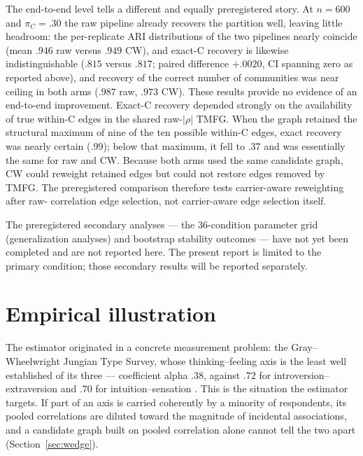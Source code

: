 \documentclass[11pt]{article}
\begin{document}
The end-to-end level tells a different and equally preregistered story.
At $n=600$ and $\pi_C=.30$ the raw pipeline already recovers the
partition well, leaving little headroom: the per-replicate ARI
distributions of the two pipelines nearly coincide (mean $.946$ raw
versus $.949$ CW), and exact-C recovery is likewise indistinguishable
($.815$ versus $.817$; paired difference $+.0020$, CI spanning zero as
reported above), and recovery of the correct number of communities was
near ceiling in both arms ($.987$ raw, $.973$ CW). These results provide no evidence of an end-to-end
improvement. Exact-C recovery depended strongly on the availability of true
within-C edges in the shared raw-$|\rho|$ TMFG. When the graph retained the structural
maximum of nine of the ten possible within-C edges, exact recovery was nearly
certain ($.99$); below that maximum, it fell to $.37$ and was essentially the
same for raw and CW. Because both arms used the same candidate graph, CW could
reweight retained edges but could not restore edges removed by TMFG. The
preregistered comparison therefore tests carrier-aware reweighting after raw-
correlation edge selection, not carrier-aware edge selection itself.

The preregistered secondary analyses --- the $36$-condition parameter grid
(generalization analyses) and bootstrap stability outcomes --- have not yet
been completed and are not
reported here. The present report is limited to the primary condition; those
secondary results will be reported separately.

\section{Empirical illustration}\label{sec:empirical}
The estimator originated in a concrete measurement problem: the
Gray--Wheelwright Jungian Type Survey, whose thinking--feeling axis is the
least well established of its three --- coefficient alpha $.38$, against
$.72$ for introversion--extraversion and $.70$ for intuition--sensation
\citep{davis2006,mattoon1995}.
This is the situation the estimator targets. If part of an axis is
carried coherently by a minority of respondents, its pooled correlations
are diluted toward the magnitude of incidental associations, and a
candidate graph built on pooled correlation alone cannot tell the two
apart (Section~\ref{sec:wedge}).
\end{document}
